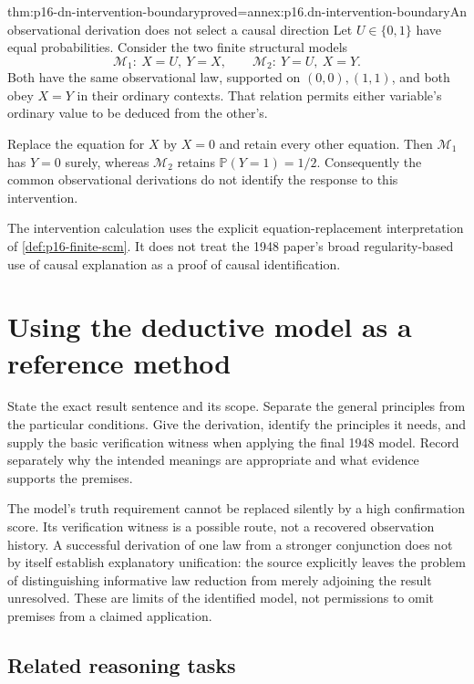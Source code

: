 \begin{hbtheorem}{thm:p16-dn-intervention-boundary}{proved=annex:p16.dn-intervention-boundary}{An observational derivation does not select a causal direction}
Let \(U\in\{0,1\}\) have equal probabilities.
Consider the two finite structural models
\[
 \mathcal M_1:\ X=U,\ Y=X,\qquad
 \mathcal M_2:\ Y=U,\ X=Y .
\]
Both have the same observational law, supported
on \((0,0),(1,1)\), and both obey \(X=Y\)
in their ordinary contexts. That relation
permits either variable's ordinary value
to be deduced from the other's.

Replace the equation for \(X\) by \(X=0\)
and retain every other equation.
Then \(\mathcal M_1\) has \(Y=0\) surely,
whereas \(\mathcal M_2\) retains
\(\mathbb P(Y=1)=1/2\).
Consequently the common observational
derivations do not identify the response
to this intervention.
\end{hbtheorem}

The intervention calculation uses the explicit
equation-replacement interpretation of
\cref{def:p16-finite-scm}. It does not treat
the 1948 paper's broad regularity-based use
of causal explanation as a proof of causal
identification.

\section{Using the deductive model as a reference method}
\label{sec:p16-dn-method}

State the exact result sentence and its scope.
Separate the general principles from the
particular conditions. Give the derivation,
identify the principles it needs, and supply
the basic verification witness when applying
the final 1948 model. Record separately why
the intended meanings are appropriate and
what evidence supports the premises.

The model's truth requirement cannot be
replaced silently by a high confirmation
score. Its verification witness is a possible
route, not a recovered observation history.
A successful derivation of one law from a
stronger conjunction does not by itself
establish explanatory unification: the
source explicitly leaves the problem of
distinguishing informative law reduction
from merely adjoining the result unresolved.
These are limits of the identified model,
not permissions to omit premises from
a claimed application.

\subsection{Related reasoning tasks}


